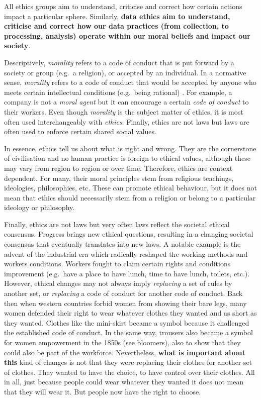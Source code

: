 \documentclass[
]{book}
\begin{document}
All ethics groups aim to understand, criticise and correct how certain actions impact a particular sphere. Similarly, \textbf{data ethics aim to understand, criticise and correct how our data practices (from collection, to processing, analysis) operate within our moral beliefs and impact our society}.

Descriptively, \emph{morality} refers to a code of conduct that is put forward by a society or group (e.g.~a religion), or accepted by an individual. In a normative sense, \emph{morality} refers to a code of conduct that would be accepted by anyone who meets certain intellectual conditions (e.g.~being rational) \citep{sep-morality-definition}. For example, a company is not a \emph{moral agent} but it can encourage a certain \emph{code of conduct} to their workers. Even though \emph{morality} is the subject matter of ethics, it is most often used interchangeably with \emph{ethics}. Finally, ethics are not laws but laws are often used to enforce certain shared social values.

In essence, ethics tell us about what is right and wrong. They are the cornerstone of civilisation and no human practice is foreign to ethical values, although these may vary from region to region or over time. Therefore, ethics are context dependent. For many, their moral principles stem from religious teachings, ideologies, philosophies, etc. These can promote ethical behaviour, but it does not mean that ethics should necessarily stem from a religion or belong to a particular ideology or philosophy.

Finally, ethics are not laws but very often laws reflect the societal ethical consensus. Progress brings new ethical questions, resulting in a changing societal consensus that eventually translates into new laws. A notable example is the advent of the industrial era which radically reshaped the working methods and workers conditions. Workers fought to claim certain rights and conditions improvement (e.g.~have a place to have lunch, time to have lunch, toilets, etc.). However, ethical changes may not always imply \emph{replacing} a set of rules by another set, or \emph{replacing} a code of conduct for another code of conduct. Back then when western countries forbid women from showing their bare legs, many women defended their right to wear whatever clothes they wanted and as short as they wanted. Clothes like the mini-skirt became a symbol because it challenged the established code of conduct. In the same way, trousers also became a symbol for women empowerment in the 1850s (see bloomers), also to show that they could also be part of the workforce. Nevertheless, \textbf{what is important about this} kind of changes is not that they were replacing their clothes for another set of clothes. They wanted to have the choice, to have control over their clothes. All in all, just because people could wear whatever they wanted it does not mean that they will wear it. But people now have the right to choose.
\end{document}
